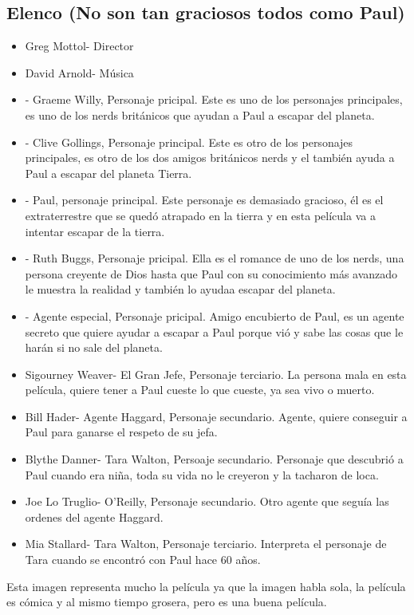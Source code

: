 \documentclass[11pt]{article}
\begin{document}
\subsection{Elenco (No son tan graciosos todos como Paul)}
\begin{itemize}
    \item Greg Mottol- Director
    \item David Arnold- Música 
    \item{}- Graeme Willy, Personaje pricipal. Este es uno de los personajes principales, es uno de los nerds británicos que ayudan a Paul a escapar del planeta.
    \item{}- Clive Gollings, Personaje principal. Este es otro de los personajes principales, es otro de los dos amigos británicos nerds y el también ayuda a Paul a escapar del planeta Tierra.
    \item{}- Paul, personaje principal. Este personaje es demasiado gracioso, él es el extraterrestre que se quedó atrapado en la tierra y en esta película va a intentar escapar de la tierra.
    \item{}- Ruth Buggs, Personaje pricipal. Ella es el romance de uno de los nerds, una persona creyente de Dios hasta que Paul con su conocimiento más avanzado le muestra la realidad y también lo ayudaa escapar del planeta.
    \item{}- Agente especial, Personaje pricipal. Amigo encubierto de Paul, es un agente secreto que quiere ayudar a escapar a Paul porque vió y sabe las cosas que le harán si no sale del planeta.
    \item Sigourney Weaver- El Gran Jefe, Personaje terciario. La persona mala en esta película, quiere tener a Paul cueste lo que cueste, ya sea vivo o muerto.
    \item Bill Hader- Agente Haggard, Personaje secundario. Agente, quiere conseguir a Paul para ganarse el respeto de su jefa.
    \item Blythe Danner- Tara Walton, Persoaje secundario. Personaje que descubrió a Paul cuando era niña, toda su vida no le creyeron y la tacharon de loca.
    \item Joe Lo Truglio- O'Reilly, Personaje secundario. Otro agente que seguía las ordenes del agente Haggard.
    \item Mia Stallard- Tara Walton, Personaje terciario. Interpreta el personaje de Tara cuando se encontró con Paul hace 60 años.
\end{itemize}
Esta imagen representa mucho la película ya que la imagen habla sola, la película es cómica y al mismo tiempo grosera, pero es una buena película.
\end{document}
